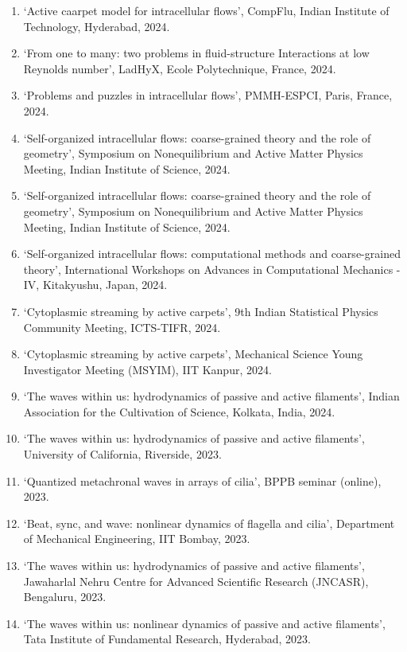 \documentclass[10pt]{res} %
\begin{document}
\begin{resume}
\begin{enumerate}
	\vspace*{5mm}
	\item `Active caarpet model for intracellular flows', CompFlu, Indian Institute of Technology, Hyderabad, 2024.
	\item `From one to many: two problems in fluid-structure Interactions at low Reynolds number', LadHyX, Ecole Polytechnique, France, 2024. 
	\item `Problems and puzzles in intracellular flows', PMMH-ESPCI, Paris, France, 2024.
	\item `Self-organized intracellular flows: coarse-grained theory and the role of geometry', Symposium on Nonequilibrium and Active Matter Physics Meeting, Indian Institute of Science, 2024.
	\item `Self-organized intracellular flows: coarse-grained theory and the role of geometry', Symposium on Nonequilibrium and Active Matter Physics Meeting, Indian Institute of Science, 2024.
	\item `Self-organized intracellular flows: computational methods and coarse-grained theory', International Workshops on Advances in Computational Mechanics - IV, Kitakyushu, Japan, 2024.
	\item `Cytoplasmic streaming by active carpets', 9th Indian Statistical Physics Community Meeting, ICTS-TIFR, 2024.
	\item `Cytoplasmic streaming by active carpets', Mechanical Science Young Investigator Meeting (MSYIM), IIT Kanpur, 2024.
	\item `The waves within us: hydrodynamics of passive and active filaments', Indian Association for the Cultivation of Science, Kolkata, India, 2024.
	\item `The waves within us: hydrodynamics of passive and active filaments', University of California, Riverside, 2023.
	\item `Quantized metachronal waves in arrays of cilia', BPPB seminar (online), 2023.
	\item `Beat, sync, and wave: nonlinear dynamics of flagella and cilia', Department of Mechanical Engineering, IIT Bombay, 2023.
	\item `The waves within us: hydrodynamics of passive and active filaments', Jawaharlal Nehru Centre for Advanced Scientific Research (JNCASR), Bengaluru, 2023.
	\item `The waves within us: nonlinear dynamics of passive and active filaments', Tata Institute of Fundamental Research, Hyderabad, 2023.

\end{enumerate}
\end{resume}
\end{document}
